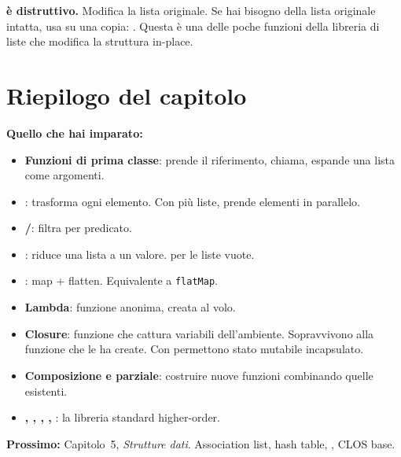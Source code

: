 \begin{attenzione}
\textbf{ è distruttivo.}
Modifica la lista originale. Se hai bisogno della lista originale
intatta, usa  su una copia: .
Questa è una delle poche funzioni della libreria di liste che modifica
la struttura in-place.
\end{attenzione}

\section*{Riepilogo del capitolo}

\begin{tcolorbox}[
  enhanced,
  colback=csBlue!5, colframe=csBlue!40,
  arc=4pt, boxrule=0.6pt,
  left=14pt, right=14pt, top=12pt, bottom=12pt,
  before skip=16pt, after skip=16pt
]
\textbf{Quello che hai imparato:}

\medskip
\begin{itemize}
  \item \textbf{Funzioni di prima classe}:  prende il
        riferimento,  chiama,  espande una lista
        come argomenti.
  \item \textbf{}: trasforma ogni elemento. Con più liste,
        prende elementi in parallelo.
  \item \textbf{/}: filtra per predicato.
  \item \textbf{}: riduce una lista a un valore.
         per le liste vuote.
  \item \textbf{}: map + flatten. Equivalente a \texttt{flatMap}.
  \item \textbf{Lambda}: funzione anonima, creata al volo.
  \item \textbf{Closure}: funzione che cattura variabili dell'ambiente.
        Sopravvivono alla funzione che le ha create.
        Con  permettono stato mutabile incapsulato.
  \item \textbf{Composizione e parziale}: costruire nuove funzioni
        combinando quelle esistenti.
  \item \textbf{, , , ,
        }: la libreria standard higher-order.
\end{itemize}

\medskip
\textbf{Prossimo:} Capitolo~5, \emph{Strutture dati}.
Association list, hash table, , CLOS base.
\end{tcolorbox}

